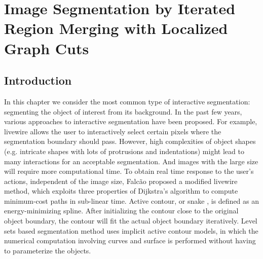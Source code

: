 \chapter{Image Segmentation by Iterated Region Merging with Localized Graph Cuts} \label{chap:IGC}
\section{Introduction} \label{sec:IGC:Introduction}
In this chapter we consider the most common type of interactive segmentation: segmenting the object of interest from its background. In the past few years, various approaches to interactive segmentation have been proposed. For example, livewire \cite{Falaco98} allows the user to interactively select certain pixels where the segmentation boundary should pass. However, high complexities of object shapes (e.g. intricate shapes with lots of protrusions and indentations) might lead to many interactions for an acceptable segmentation. And images with the large size will require more computational time. To obtain real time response to the user's actions, independent of the image size, Falc{\~{a}}o \cite{Falco} proposed a modified livewire method, which exploits three properties of Dijkstra's algorithm to compute minimum-cost paths in sub-linear time. Active contour, or snake \cite{Kass88}, is defined as an energy-minimizing spline. After initializing the contour close to the original object boundary, the contour will fit the actual object boundary iteratively. Level sets based segmentation method \cite{Osher88} uses implicit active contour models, in which the numerical computation involving curves and surface is performed without having to parameterize the objects.

